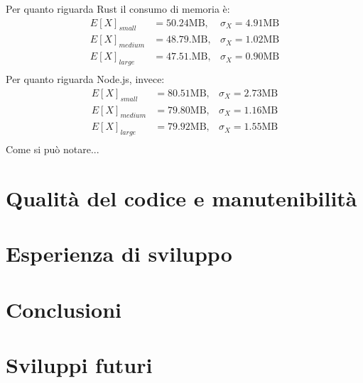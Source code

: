 Per quanto riguarda Rust il consumo di memoria è:
\begin{align*}
    E[X]_{small}&=50.24\text{MB},  & \sigma_X=4.91\text{MB}\\
    E[X]_{medium}&=48.79.\text{MB},  & \sigma_X=1.02\text{MB}\\
    E[X]_{large}&=47.51.\text{MB},  & \sigma_X=0.90\text{MB}\\
\end{align*}
Per quanto riguarda Node.js, invece:
\begin{align*}
    E[X]_{small}&=80.51\text{MB},  & \sigma_X=2.73\text{MB}\\
    E[X]_{medium}&=79.80\text{MB},  & \sigma_X=1.16\text{MB}\\
    E[X]_{large}&=79.92\text{MB},  & \sigma_X=1.55\text{MB}\\
\end{align*}
Come si può notare...
\newpage
\section{Qualità del codice e manutenibilità}
\section{Esperienza di sviluppo}
\section{Conclusioni}
\section{Sviluppi futuri}
\begin{lstlisting}[language=Javascript, showstringspaces=false]
\end{lstlisting}